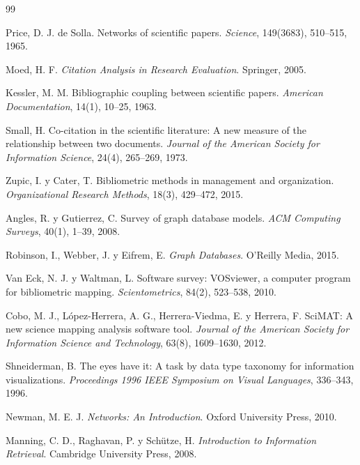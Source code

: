 \documentclass[11pt,spanish,listoffigures,listoftables]{tfgetsinf}
\begin{document}
\begin{thebibliography}{99}

Price, D. J. de Solla.
\newblock Networks of scientific papers.
\newblock \textit{Science}, 149(3683), 510--515, 1965.

Moed, H. F.
\newblock \textit{Citation Analysis in Research Evaluation}.
\newblock Springer, 2005.

Kessler, M. M.
\newblock Bibliographic coupling between scientific papers.
\newblock \textit{American Documentation}, 14(1), 10--25, 1963.

Small, H.
\newblock Co-citation in the scientific literature: A new measure of the relationship between two documents.
\newblock \textit{Journal of the American Society for Information Science}, 24(4), 265--269, 1973.

Zupic, I. y Cater, T.
\newblock Bibliometric methods in management and organization.
\newblock \textit{Organizational Research Methods}, 18(3), 429--472, 2015.

Angles, R. y Gutierrez, C.
\newblock Survey of graph database models.
\newblock \textit{ACM Computing Surveys}, 40(1), 1--39, 2008.

Robinson, I., Webber, J. y Eifrem, E.
\newblock \textit{Graph Databases}.
\newblock O'Reilly Media, 2015.

Van Eck, N. J. y Waltman, L.
\newblock Software survey: VOSviewer, a computer program for bibliometric mapping.
\newblock \textit{Scientometrics}, 84(2), 523--538, 2010.

Cobo, M. J., López-Herrera, A. G., Herrera-Viedma, E. y Herrera, F.
\newblock SciMAT: A new science mapping analysis software tool.
\newblock \textit{Journal of the American Society for Information Science and Technology}, 63(8), 1609--1630, 2012.

Shneiderman, B.
\newblock The eyes have it: A task by data type taxonomy for information visualizations.
\newblock \textit{Proceedings 1996 IEEE Symposium on Visual Languages}, 336--343, 1996.

Newman, M. E. J.
\newblock \textit{Networks: An Introduction}.
\newblock Oxford University Press, 2010.

Manning, C. D., Raghavan, P. y Schütze, H.
\newblock \textit{Introduction to Information Retrieval}.
\newblock Cambridge University Press, 2008.


\end{thebibliography}
\end{document}
